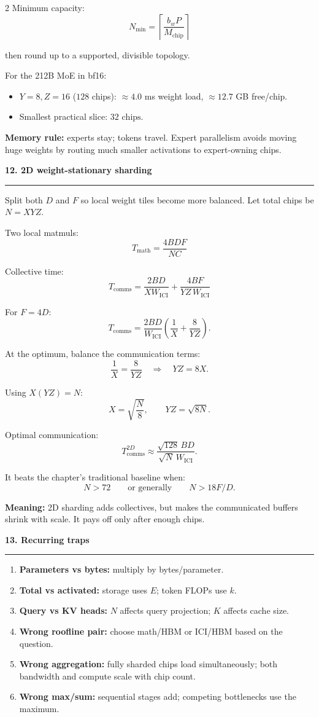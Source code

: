 \documentclass[8pt,a4paper]{extarticle}
\newcommand{\sect}[1]{%
  \vspace{2pt}%
  {\color{DeepBlue}\normalsize\bfseries #1}\par
  \vspace{0.5pt}\hrule\vspace{1.5pt}
}
\newcommand{\formula}[1]{%
  \[
    \boxed{\displaystyle #1}
  \]
}
\newcommand{\callout}[2][LightBlue]{%
  \vspace{1pt}\noindent
  \colorbox{#1}{%
    \parbox{\dimexpr\linewidth-2\fboxsep\relax}{\footnotesize #2}%
  }\vspace{1pt}
}
\begin{document}
\begin{multicols}{2}
Minimum capacity:
\formula{
N_{\min}=
\left\lceil\frac{b_wP}{M_{\mathrm{chip}}}\right\rceil
}
then round up to a supported, divisible topology.

For the 212B MoE in bf16:
\begin{itemize}
  \item $Y=8,Z=16$ ($128$ chips): $\approx4.0$ ms weight load,
  $\approx12.7$ GB free/chip.
  \item Smallest practical slice: $\boxed{32\text{ chips}}$.
\end{itemize}

\callout[Warm]{%
\textbf{Memory rule:} experts stay; tokens travel.
Expert parallelism avoids moving huge weights by routing much smaller
activations to expert-owning chips.
}

\columnbreak

\sect{12. 2D weight-stationary sharding}

Split both $D$ and $F$ so local weight tiles become more balanced.
Let total chips be $N=XYZ$.

Two local matmuls:
\formula{
T_{\mathrm{math}}=\frac{4BDF}{NC}
}

Collective time:
\formula{
T_{\mathrm{comms}}=
\frac{2BD}{XW_{\mathrm{ICI}}}
+
\frac{4BF}{YZ\,W_{\mathrm{ICI}}}
}

For $F=4D$:
\[
T_{\mathrm{comms}}
=
\frac{2BD}{W_{\mathrm{ICI}}}
\left(\frac1X+\frac8{YZ}\right).
\]

At the optimum, balance the communication terms:
\[
\frac1X=\frac8{YZ}
\quad\Longrightarrow\quad
\boxed{YZ=8X}.
\]

Using $X(YZ)=N$:
\[
\boxed{
X=\sqrt{\frac N8},
\qquad
YZ=\sqrt{8N}
}.
\]

Optimal communication:
\[
\boxed{
T_{\mathrm{comms}}^{2D}
\approx
\frac{\sqrt{128}\,BD}
{\sqrt N\,W_{\mathrm{ICI}}}
}.
\]

It beats the chapter's traditional baseline when:
\[
\boxed{N>72}
\qquad
\text{or generally}\qquad
\boxed{N>18F/D}.
\]

\textbf{Meaning:} 2D sharding adds collectives, but makes the communicated
buffers shrink with scale. It pays off only after enough chips.

\sect{13. Recurring traps}

\begin{enumerate}
  \item \textbf{Parameters vs bytes:} multiply by bytes/parameter.
  \item \textbf{Total vs activated:} storage uses $E$; token FLOPs use $k$.
  \item \textbf{Query vs KV heads:} $N$ affects query projection; $K$ affects
  cache size.
  \item \textbf{Wrong roofline pair:} choose math/HBM or ICI/HBM based on the
  question.
  \item \textbf{Wrong aggregation:} fully sharded chips load simultaneously;
  both bandwidth and compute scale with chip count.
  \item \textbf{Wrong max/sum:} sequential stages add; competing bottlenecks
  use the maximum.
\end{enumerate}


\end{multicols}
\end{document}
